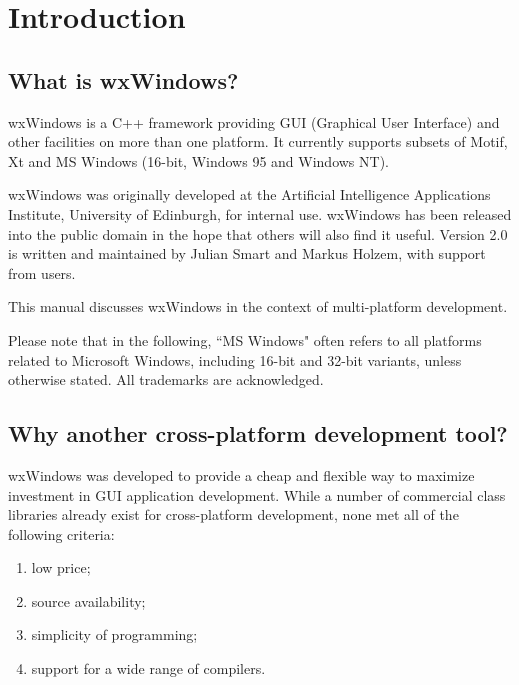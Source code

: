 \chapter{Introduction}\label{introduction}
%
%
\setfooter{\thepage}{}{}{}{}{\thepage}%

\section{What is wxWindows?}

wxWindows is a C++ framework providing GUI (Graphical User
Interface) and other facilities on more than one platform.  It currently
supports subsets of Motif, Xt and MS Windows (16-bit, Windows 95 and Windows NT).

wxWindows was originally developed at the Artificial Intelligence
Applications Institute, University of Edinburgh, for internal use.
wxWindows has been released into the public domain in the hope
that others will also find it useful. Version 2.0 is written and
maintained by Julian Smart and Markus Holzem, with support from users.

This manual discusses wxWindows in the context of multi-platform
development.

Please note that in the following, ``MS Windows" often refers to all
platforms related to Microsoft Windows, including 16-bit and 32-bit
variants, unless otherwise stated. All trademarks are acknowledged.

\section{Why another cross-platform development tool?}

wxWindows was developed to provide a cheap and flexible way to maximize
investment in GUI application development.  While a number of commercial
class libraries already exist for cross-platform development,
none met all of the following criteria:

\begin{enumerate}\itemsep=0pt
\item low price;
\item source availability;
\item simplicity of programming;
\item support for a wide range of compilers.
\end{enumerate}

